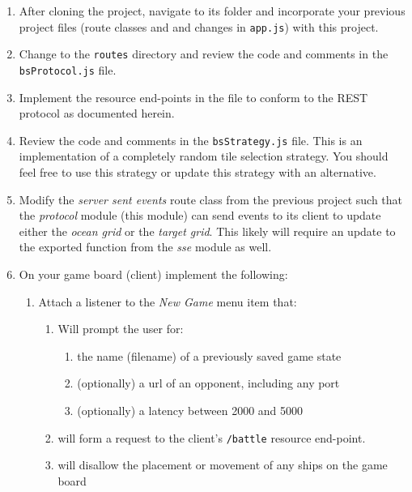 \documentclass[10pt]{article}
\begin{document}
\begin{enumerate}
	\item After cloning the project, navigate to its folder and incorporate your previous project files (route classes and and changes in \verb|app.js|) with this project. 
   
   \item Change to the \verb|routes| directory and review the code and comments in the \verb|bsProtocol.js| file. 
   
   \item Implement the resource end-points in the file to conform to the REST protocol as documented herein. 
   
   \item Review the code and comments in the \verb|bsStrategy.js| file. This is an implementation of a completely random tile selection strategy. You should feel free to use this strategy or update this strategy with an alternative. 
   
   \item Modify the \emph{server sent events} route class from the previous project such that the \emph{protocol} module (this module) can send events to its client to update either the \emph{ocean grid} or the \emph{target grid}. This likely will require an update to the exported function from the \emph{sse} module as well. 
   
   \item On your game board (client) implement the following:
   \begin{enumerate}
      \item Attach a listener to the \emph{New Game} menu item that:
      \begin{enumerate}
         \item Will prompt the user for:
         \begin{enumerate}
            \item the name (filename) of a previously saved game state 
            \item (optionally) a url of an opponent, including any port
            \item (optionally) a latency between 2000 and 5000
         \end{enumerate}

         \item will form a request to the client's \verb|/battle| resource end-point.
         
         \item will disallow the placement or movement of any ships on the game board
         

\end{enumerate}
\end{enumerate}
\end{enumerate}
\end{document}
